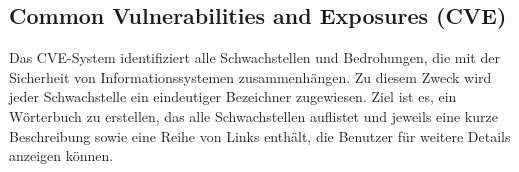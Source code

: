 \subsection{Common Vulnerabilities and Exposures (CVE)}

Das CVE-System identifiziert alle Schwachstellen und Bedrohungen, die mit der Sicherheit von Informationssystemen zusammenhängen. Zu diesem Zweck wird jeder Schwachstelle ein eindeutiger Bezeichner zugewiesen. Ziel ist es, ein Wörterbuch zu erstellen, das alle Schwachstellen auflistet und jeweils eine kurze Beschreibung sowie eine Reihe von Links enthält, die Benutzer für weitere Details anzeigen können\cite{cve18}.\\
















